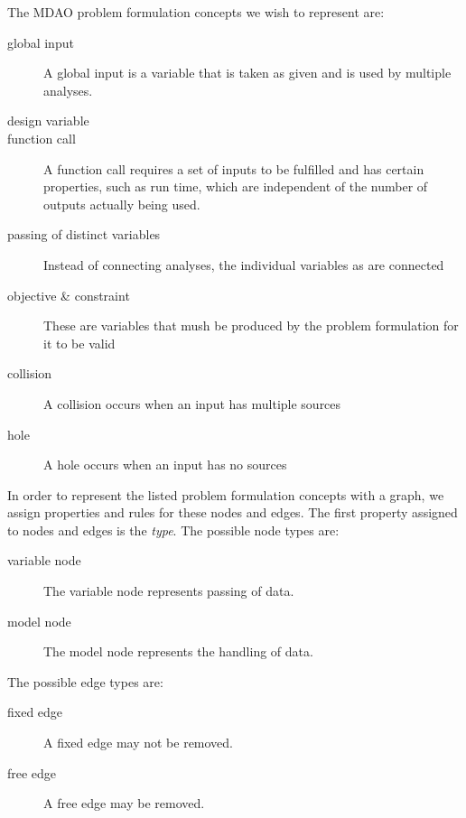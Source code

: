 The MDAO problem formulation concepts we wish to represent are:
\begin{description}
\item[global input] A global input is a variable that is taken as given and is used by multiple analyses.
\item[design variable]
\item[function call] A function call requires a set of inputs to be fulfilled and has certain properties, such as run time, which are independent of the number of outputs actually being used.
\item[passing of distinct variables] Instead of connecting analyses, the individual variables as are connected
\item[objective \& constraint] These are variables that mush be produced by the problem formulation for it to be valid
\item[collision] A collision occurs when an input has multiple sources
\item[hole] A hole occurs when an input has no sources
\end{description}

In order to represent the listed problem formulation concepts with a graph, we assign properties and rules for these nodes and edges.
The first property assigned to nodes and edges is the \emph{type}. The possible node types are:
\begin{description}
\item[variable node] The variable node represents passing of data.
\item[model node] The model node represents the handling of data.
\end{description}

The possible edge types are:
\begin{description}
\item[fixed edge] A fixed edge may not be removed.
\item[free edge] A free edge may be removed.
\end{description}

